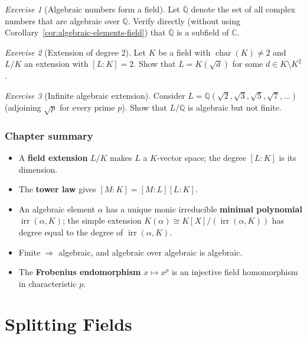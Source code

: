 \documentclass[12pt,a4paper,openany]{book}
\theoremstyle{definition}
\theoremstyle{remark}
\newtheorem{exercise}{Exercise}[chapter]
\newcommand{\Q}{\mathbb{Q}}
\newcommand{\C}{\mathbb{C}}
\DeclareMathOperator{\chr}{char}
\DeclareMathOperator{\irr}{irr}
\begin{document}
\begin{exercise}[Algebraic numbers form a field]
\label{exer:alg-numbers-field}
Let $\overline{\Q}$ denote the set of all complex numbers that are
algebraic over $\Q$. Verify directly (without using
Corollary~\ref{cor:algebraic-elements-field}) that $\overline{\Q}$
is a subfield of $\C$.
\end{exercise}

\begin{exercise}[Extension of degree $2$]
\label{exer:deg-2-extension}
Let $K$ be a field with $\chr(K) \ne 2$ and $L/K$ an extension with
$[L:K]=2$. Show that $L = K(\sqrt{d})$ for some $d \in K \setminus
K^2$.
\end{exercise}

\begin{exercise}[Infinite algebraic extension]
\label{exer:infinite-algebraic}
Consider $L = \Q(\sqrt{2}, \sqrt{3}, \sqrt{5}, \sqrt{7}, \dots)$
(adjoining $\sqrt{p}$ for every prime $p$). Show that $L/\Q$ is
algebraic but not finite.
\end{exercise}

\subsection*{Chapter summary}

\begin{itemize}[leftmargin=2em]
  \item A \textbf{field extension} $L/K$ makes $L$ a $K$-vector space;
    the degree $[L:K]$ is its dimension.
  \item The \textbf{tower law} gives
    $[M:K] = [M:L][L:K]$.
  \item An algebraic element $\alpha$ has a unique monic irreducible
    \textbf{minimal polynomial} $\irr(\alpha,K)$; the simple extension
    $K(\alpha) \cong K[X]/(\irr(\alpha,K))$ has degree equal to the
    degree of $\irr(\alpha,K)$.
  \item Finite $\Rightarrow$ algebraic, and algebraic over algebraic
    is algebraic.
  \item The \textbf{Frobenius endomorphism} $x \mapsto x^p$ is an
    injective field homomorphism in characteristic $p$.
\end{itemize}


\chapter{Splitting Fields}
\label{ch:splitting-fields}
\end{document}
